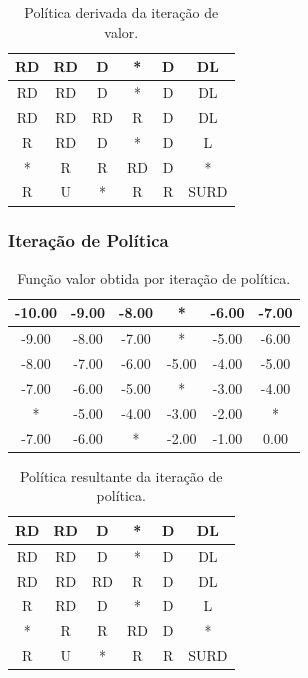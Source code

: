 \documentclass[a4paper,12pt]{article}
\begin{document}
\begin{table}[htbp]
\centering
\begin{tabular}{|c|c|c|c|c|c|}
\hline
RD  & RD  & D   & *   & D   & DL   \\
\hline
RD  & RD  & D   & *   & D   & DL   \\
\hline
RD  & RD  & RD  & R   & D   & DL   \\
\hline
R   & RD  & D   & *   & D   & L    \\
\hline
*   & R   & R   & RD  & D   & *    \\
\hline
R   & U   & *   & R   & R   & SURD \\
\hline
\end{tabular}
\caption{Política derivada da iteração de valor.}
\end{table}

\newpage

\subsubsection{Iteração de Política}

\begin{table}[htbp]
\centering
\begin{tabular}{|c|c|c|c|c|c|}
\hline
-10.00 & -9.00 & -8.00 & *     & -6.00 & -7.00 \\
\hline
-9.00  & -8.00 & -7.00 & *     & -5.00 & -6.00 \\
\hline
-8.00  & -7.00 & -6.00 & -5.00 & -4.00 & -5.00 \\
\hline
-7.00  & -6.00 & -5.00 & *     & -3.00 & -4.00 \\
\hline
*      & -5.00 & -4.00 & -3.00 & -2.00 & *     \\
\hline
-7.00  & -6.00 & *     & -2.00 & -1.00 & 0.00  \\
\hline
\end{tabular}
\caption{Função valor obtida por iteração de política.}
\end{table}

\begin{table}[htbp]
\centering
\begin{tabular}{|c|c|c|c|c|c|}
\hline
RD  & RD  & D   & *   & D   & DL   \\
\hline
RD  & RD  & D   & *   & D   & DL   \\
\hline
RD  & RD  & RD  & R   & D   & DL   \\
\hline
R   & RD  & D   & *   & D   & L    \\
\hline
*   & R   & R   & RD  & D   & *    \\
\hline
R   & U   & *   & R   & R   & SURD \\
\hline
\end{tabular}
\caption{Política resultante da iteração de política.}
\end{table}
\end{document}
